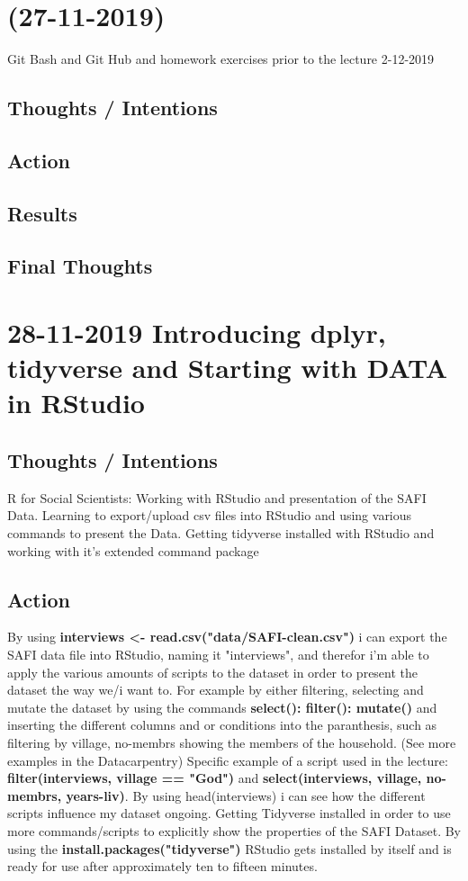 \documentclass{article}
\begin{document}
\section{(27-11-2019)} Git Bash and Git Hub and homework exercises prior to the lecture 2-12-2019
\subsection{Thoughts / Intentions}
\subsection{Action}
\subsection{Results}
\subsection{Final Thoughts}
\newpage

\section{28-11-2019 Introducing dplyr, tidyverse and Starting with DATA in RStudio}
\subsection{Thoughts / Intentions}
R for Social Scientists: Working with RStudio and presentation of the SAFI Data.
Learning to export/upload csv files into RStudio and using various commands to present the Data.
Getting tidyverse installed with RStudio and working with it's extended command package
\subsection{Action}
By using \textbf{interviews <- read.csv("data/SAFI-clean.csv")} i can export the SAFI data file into RStudio, naming it "interviews", and therefor i'm able to apply the various amounts of scripts to the dataset in order to present the dataset the way we/i want to.
For example by either filtering, selecting and mutate the dataset by using the commands \textbf{select(): 
filter():  mutate()} and inserting the different columns and or conditions into the paranthesis, such as filtering by village, no-membrs showing the members of the household. (See more examples in the Datacarpentry) Specific example of a script used in the lecture: \textbf{filter(interviews, village == "God")} and \textbf{select(interviews, village, no-membrs, years-liv)}. By using head(interviews) i can see how the different scripts influence my dataset ongoing.
\newline 
Getting Tidyverse installed in order to use more commands/scripts to explicitly show the properties of the SAFI Dataset. By using the\textbf{ install.packages("tidyverse")} RStudio gets installed by itself and is ready for use after approximately ten to fifteen minutes. 
\end{document}
